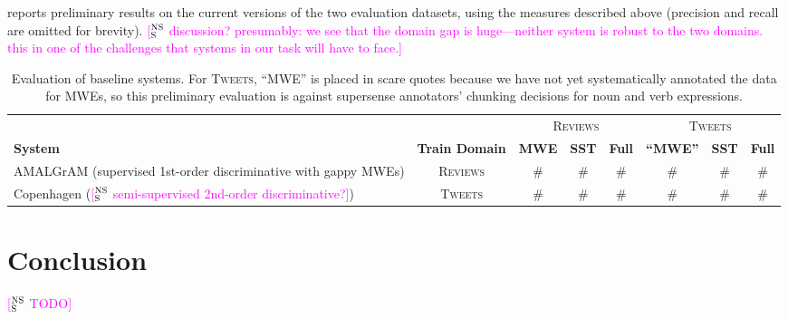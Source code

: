 \documentclass[11pt]{article}
\newcommand{\ensuretext}[1]{#1}
\newcommand{\nssmarker}{\ensuretext{\textcolor{magenta}{\ensuremath{^{\textsc{NS}}_{\textsc{S}}}}}}
\newcommand{\arkcomment}[3]{\ensuretext{\textcolor{#3}{[#1 #2]}}}
\newcommand{\nss}[1]{\arkcomment{\nssmarker}{#1}{magenta}}
\begin{document}
 reports preliminary results on the current versions of the two evaluation datasets, 
using the measures described above (precision and recall are omitted for brevity).
\nss{discussion? presumably: we see that the domain gap is huge---neither system is robust to the two domains.
this in one of the challenges that systems in our task will have to face.}

\begin{table*}\centering\small
\begin{tabular}{lccccccc}
           &  & \multicolumn{3}{c}{\textsc{Reviews}} & \multicolumn{3}{c}{\textsc{Tweets}} \\
           \cmidrule(r){3-5}\cmidrule(l){6-8}
\bfseries System     & \bfseries Train Domain & \bfseries MWE & \bfseries SST & \bfseries Full
                                              & \bfseries ``MWE'' & \bfseries SST & \bfseries Full \\
\midrule
AMALGrAM (supervised 1st-order discriminative with gappy MWEs) & \textsc{Reviews} & \# & \# & \# & \# & \# & \# \\
Copenhagen (\nss{semi-supervised 2nd-order discriminative?}) & \textsc{Tweets} & \# & \# & \#  & \# & \# & \# \\
\end{tabular}
\caption{Evaluation of baseline systems. For \textsc{Tweets}, ``MWE'' is placed in scare quotes 
because we have not yet systematically annotated the data for MWEs, so this preliminary evaluation 
is against supersense annotators' chunking decisions for noun and verb expressions.}
\label{tbl:baselines}
\end{table*}

\section{Conclusion}

\nss{TODO}


\setlength{\bibsep}{10pt}
{\fontsize{10}{12.25}\selectfont
}
\end{document}
